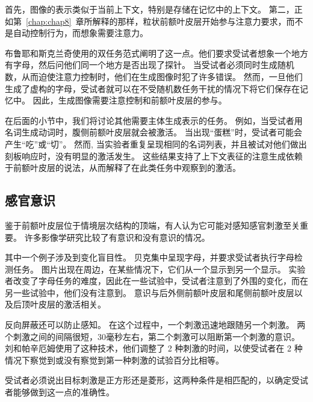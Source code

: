 首先，图像的表示类似于当前上下文，特别是存储在记忆中的上下文。
第二，正如第~\ref{chap:chap8}~章所解释的那样，粒状前额叶皮层开始参与注意力要求，而不是自动控制行为，而想象需要注意力。
\par


布鲁耶和斯克兰奇\cite{bruyer1998visuospatial}使用的双任务范式阐明了这一点。他们要求受试者想象一个地方有字母，然后问他们同一个地方是否出现了探针\cite{kosslyn1995cognitive}。
当受试者必须同时生成随机数，从而迫使注意力控制时，他们在生成图像时犯了许多错误。
然而，一旦他们生成了虚构的字母，受试者就可以在不受随机数任务干扰的情况下将它们保存在记忆中。
因此，生成图像需要注意控制和前额叶皮层的参与。
\par


在后面的小节中，我们将讨论其他需要主体生成表示的任务。
例如，当受试者用名词生成动词时，腹侧前额叶皮层就会被激活。
当出现“蛋糕”时，受试者可能会产生“吃”或“切”。
然而, 当实验者重复呈现相同的名词列表，并且被试对他们做出刻板响应时，没有明显的激活发生\cite{raichle1994practice}。
这些结果支持了上下文表征的注意生成依赖于前额叶皮层的说法，从而解释了在此类任务中观察到的激活。



\subsection{感官意识}

鉴于前额叶皮层位于情境层次结构的顶端，有人认为它可能对感知感官刺激至关重要\cite{crick1998consciousness}。
许多影像学研究比较了有意识和没有意识的情况\cite{rees2002neural}。
\par


其中一个例子涉及到变化盲目性。
贝克\cite{beck2001neural}集中呈现字母，并要求受试者执行字母检测任务。
图片出现在周边，在某些情况下，它们从一个显示到另一个显示。
实验者改变了字母任务的难度，因此在一些试验中，受试者注意到了外围的变化，而在另一些试验中，他们没有注意到。
意识与后外侧前额叶皮层和尾侧前额叶皮层以及后顶叶皮层的激活相关。
\par


反向屏蔽还可以防止感知。
在这个过程中，一个刺激迅速地跟随另一个刺激。
两个刺激之间的间隔很短，30毫秒左右，第二个刺激可以阻断第一个刺激的意识。
刘和帕辛厄姆\cite{lau2006relative}使用了这种技术，他们调整了 2 种刺激的时间，以使受试者在 2 种情况下察觉到或没有察觉到第一种刺激的试验百分比相等。
\par


受试者必须说出目标刺激是正方形还是菱形，这两种条件是相匹配的，以确定受试者能够做到这一点的准确性。
\par


